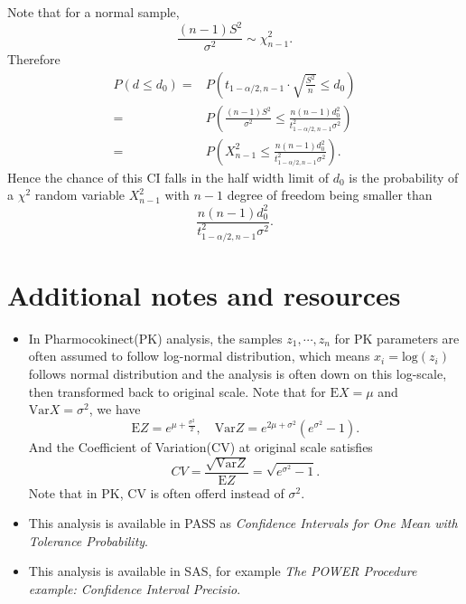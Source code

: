 \documentclass[a4paper,12pt]{article}
\begin{document}
Note that for a normal sample,
\[
  \frac{\left(n - 1\right)S^2}{\sigma^2} \sim \chi^2_{n - 1}
  .
\]
Therefore
\[
  \begin{aligned}
    P\left(
      d \leq d_0
    \right)
    =& P\left(
      t_{1 - \alpha / 2, n - 1}
      \cdot \sqrt{\frac{S^2}{n}}
      \leq d_0
    \right)    \\
    =& P\left(
      \frac{\left(n - 1\right)S^2}{\sigma^2}
      \leq \frac{
        n\left(n - 1\right)d_0^2
      }{
        t_{1 - \alpha / 2, n - 1}^2
        \sigma^2
      }
    \right)    \\
    =& P\left(
      X_{n - 1}^2 \leq
      \frac{
        n\left(n - 1\right)d_0^2
      }{
        t_{1 - \alpha / 2, n - 1}^2
        \sigma^2
      }
    \right)
    .
  \end{aligned}
\]
Hence the chance of this CI falls in the half width limit of $d_0$ is the probability of a $\chi^2$ random variable $X^2_{n - 1}$ with $n - 1$ degree of freedom being smaller than
\[
  \frac{
    n\left(n - 1\right)d_0^2
  }{
    t_{1 - \alpha / 2, n - 1}^2
    \sigma^2
  }
  .
\]

\section{Additional notes and resources}
\label{sec:addit-notes-reso}


\begin{itemize}
\item In Pharmocokinect(PK) analysis, the samples $z_1, \cdots, z_n$ for PK parameters are often assumed to follow log-normal distribution, which means $x_i = \mathrm{log}\left(z_i\right)$ follows normal distribution and the analysis is often down on this log-scale, then transformed back to original scale. Note that for $\mathrm{E}X = \mu$ and $\mathrm{Var}X = \sigma^2$, we have
  \[
    \mathrm{E}Z = e^{\mu + \frac{\sigma^2}{2}}
    ,\quad
    \mathrm{Var}Z = e^{2\mu + \sigma^2}\left(e^{\sigma^2} - 1\right)
    .
  \]
  And the Coefficient of Variation(CV) at original scale satisfies
  \[
    CV = \frac{\sqrt{\mathrm{Var}Z}}{\mathrm{E}Z} =
    \sqrt{
      e^{\sigma^2} - 1
    }
    .
  \]
  Note that in PK, CV is often offerd instead of $\sigma^2$.
\item This analysis is available in PASS as \emph{Confidence Intervals for One Mean with Tolerance Probability}.
\item This analysis is available in SAS, for example \emph{The POWER Procedure example: Confidence Interval Precisio}.
\end{itemize}
\end{document}
